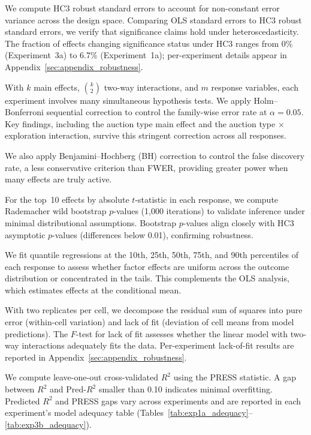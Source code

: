 We compute HC3 robust standard errors \citep{MacKinnonWhite1985} to account for non-constant error variance across the design space. Comparing OLS standard errors to HC3 robust standard errors, we verify that significance claims hold under heteroscedasticity. The fraction of effects changing significance status under HC3 ranges from 0\% (Experiment~3a) to 6.7\% (Experiment~1a); per-experiment details appear in Appendix~\ref{sec:appendix_robustness}.

With $k$ main effects, $\binom{k}{2}$ two-way interactions, and $m$ response variables, each experiment involves many simultaneous hypothesis tests. We apply Holm--Bonferroni sequential correction \citep{Holm1979} to control the family-wise error rate at $\alpha = 0.05$. Key findings, including the auction type main effect and the auction type $\times$ exploration interaction, survive this stringent correction across all responses.

We also apply Benjamini--Hochberg (BH) correction \citep{BenjaminiHochberg1995} to control the false discovery rate, a less conservative criterion than FWER, providing greater power when many effects are truly active.

For the top~10 effects by absolute $t$-statistic in each response, we compute Rademacher wild bootstrap $p$-values \citep{DavidsonFlachaire2008} (1{,}000 iterations) to validate inference under minimal distributional assumptions. Bootstrap $p$-values align closely with HC3 asymptotic $p$-values (differences below 0.01), confirming robustness.

We fit quantile regressions \citep{KoenkerBassett1978} at the 10th, 25th, 50th, 75th, and 90th percentiles of each response to assess whether factor effects are uniform across the outcome distribution or concentrated in the tails. This complements the OLS analysis, which estimates effects at the conditional mean.


With two replicates per cell, we decompose the residual sum of squares into pure error (within-cell variation) and lack of fit (deviation of cell means from model predictions). The $F$-test for lack of fit assesses whether the linear model with two-way interactions adequately fits the data. Per-experiment lack-of-fit results are reported in Appendix~\ref{sec:appendix_robustness}.

We compute leave-one-out cross-validated $R^2$ using the PRESS statistic. A gap between $R^2$ and Pred-$R^2$ smaller than 0.10 indicates minimal overfitting. Predicted $R^2$ and PRESS gaps vary across experiments and are reported in each experiment's model adequacy table (Tables~\ref{tab:exp1a_adequacy}--\ref{tab:exp3b_adequacy}).

